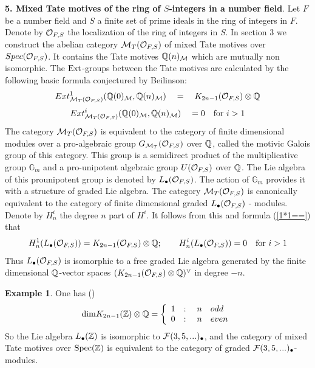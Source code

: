 \documentclass[10pt]{article}
\begin{document}
   {\bf 5. Mixed Tate motives of the ring of $S$-integers in a number field}. 
Let $F$ be a number field and $S$ a finite set of prime ideals in  
the ring of integers in $F$. Denote by ${\cal O}_{F, S}$ 
the localization of the ring of integers in $S$. 
In section 3 we construct the abelian category ${\cal M}_{T}({\cal O}_{F, S})$ 
of mixed Tate motives over  
$Spec({\cal O}_{F, S})$. It contains the Tate motives ${\mathbb Q}(n)_{\cal M}$ which are mutually non isomorphic. The ${\rm Ext}$-groups between the 
Tate motives are calculated by the following basic formula conjectured by Beilinson: 
\begin{equation} \label{1*1=}
Ext^1_{{\cal M}_{T}({\cal O}_{F, S})}({\mathbb Q}(0)_{\cal M} , {\mathbb Q}(n)_{\cal M}) \quad 
= \quad K_{2n-1}({\cal O}_{F, S})\otimes {\mathbb Q}
\end{equation} 
\begin{equation} \label{1*1==}
Ext^i_{{\cal M}_{T}({\cal O}_{F, S})}({\mathbb Q}(0)_{\cal M} , {\mathbb Q}(n)_{\cal M}) \quad 
= 0 \quad \mbox{for $i>1$}
\end{equation}
The category ${\cal M}_{T}({\cal O}_{F, S})$ is equivalent to 
the category of finite dimensional modules over
 a pro-algebraic group $G_{{\cal M}_{T}}({\cal O}_{F, S})$ over ${\mathbb Q}$, 
called the motivic Galois group
of this category. This group is a semidirect product of the multiplicative group
${\mathbb G}_m$ and a pro-unipotent algebraic group $U({\cal O}_{F, S})$ over ${\mathbb Q}$. 
The Lie algebra of this prounipotent group is 
denoted by 
${   L}_{\bullet}({\cal O}_{F, S})$. The action of ${\mathbb G}_m$ provides it with a structure of 
graded Lie algebra. The category ${\cal M}_{T}({\cal O}_{F, S})$ 
is canonically equivalent to the category of finite dimensional graded 
${   L}_{\bullet}({\cal O}_{F, S})$ - modules. Denote by $H_n^i$ the degree $n$ part of $H^i$. 
It follows from this and formula (\ref{1*1==}) that 
$$
H_n^1({   L}_{\bullet}({\cal O}_{F, S})) = 
K_{2n-1}({\cal O}_{F, S})\otimes {\mathbb Q}; \qquad 
H_n^i({   L}_{\bullet}({\cal O}_{F, S})) = 0 \quad \mbox{for $i>1$}
$$
Thus ${   L}_{\bullet}({\cal O}_{F, S})$ is  isomorphic to a  free graded Lie algebra 
generated by the finite dimensional ${\mathbb Q}$-vector spaces 
$(K_{2n-1}({\cal O}_{F, S})\otimes {\mathbb Q})^{\vee}$ in degree $-n$. 

{\bf Example 1}.  One has (\cite{Bo})
\begin{equation} \label{kg}
{\rm dim} K_{2n-1}({\mathbb Z})\otimes {\mathbb Q} = 
\left\{ \begin{array}{ll}
1 &: \quad n \quad odd
\\ 
0 &: \quad n \quad even \end{array}\right.
\end{equation}
So the  Lie algebra ${   L}_{\bullet}({\mathbb Z})$ is 
isomorphic to ${\cal F}(3,5, ... )_{\bullet}$, and 
the category of mixed Tate motives over ${\rm Spec}({\mathbb Z})$ is equivalent to 
the category of 
graded ${\cal F}(3,5, ... )_{\bullet}$-modules. 
\end{document}
